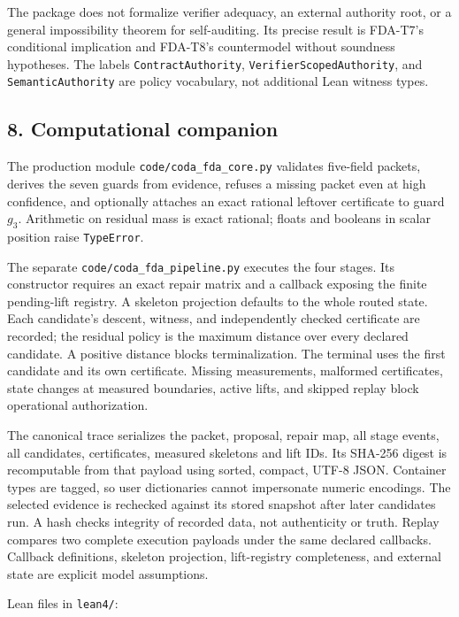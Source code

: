 \documentclass[
  11pt,
]{article}
\begin{document}
The package does not formalize verifier adequacy, an external authority root, or a general impossibility theorem for self-auditing. Its precise result is FDA-T7's conditional implication and FDA-T8's countermodel without soundness hypotheses. The labels \texttt{ContractAuthority}, \nolinkurl{VerifierScopedAuthority}, and \texttt{SemanticAuthority} are policy vocabulary, not additional Lean witness types.

\subsection{8. Computational companion}\label{computational-companion}

The production module \nolinkurl{code/coda_fda_core.py} validates five-field packets, derives the seven guards from evidence, refuses a missing packet even at high confidence, and optionally attaches an exact rational leftover certificate to guard \(g_3\). Arithmetic on residual mass is exact rational; floats and booleans in scalar position raise \texttt{TypeError}.

The separate \nolinkurl{code/coda_fda_pipeline.py} executes the four stages. Its constructor requires an exact repair matrix and a callback exposing the finite pending-lift registry. A skeleton projection defaults to the whole routed state. Each candidate's descent, witness, and independently checked certificate are recorded; the residual policy is the maximum distance over every declared candidate. A positive distance blocks terminalization. The terminal uses the first candidate and its own certificate. Missing measurements, malformed certificates, state changes at measured boundaries, active lifts, and skipped replay block operational authorization.

The canonical trace serializes the packet, proposal, repair map, all stage events, all candidates, certificates, measured skeletons and lift IDs. Its SHA-256 digest is recomputable from that payload using sorted, compact, UTF-8 JSON. Container types are tagged, so user dictionaries cannot impersonate numeric encodings. The selected evidence is rechecked against its stored snapshot after later candidates run. A hash checks integrity of recorded data, not authenticity or truth. Replay compares two complete execution payloads under the same declared callbacks. Callback definitions, skeleton projection, lift-registry completeness, and external state are explicit model assumptions.

Lean files in \texttt{lean4/}:
\end{document}

